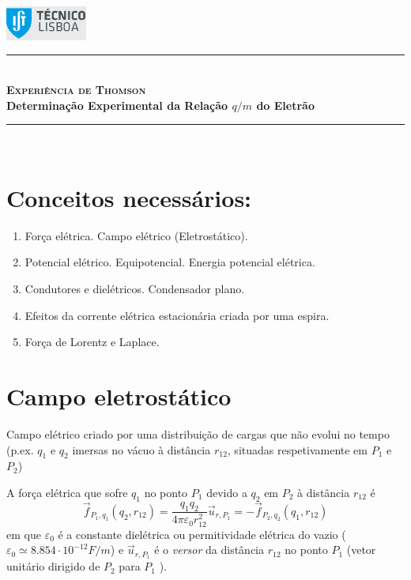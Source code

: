 \documentclass[a4paper,twoside,12pt]{article}      %
\author{Prof. Bernardo B. Carvalho}
\date{ Setembro 2012}
\newcommand{\HRule}{\rule{\linewidth}{0.5mm}}
\begin{document}
 

\includegraphics[width=0.2\textwidth]{../logo-ist}%

\HRule \\[0.5cm]
{ \huge   \bfseries \textsc{ Experiência de Thomson} }\\[0.4cm]
{ \large \bfseries Determinação Experimental da Relação $q/m$ do Eletrão }\\
\HRule \\%


\section{\sf  Conceitos necessários:} 
\begin{enumerate}
	\item Força elétrica. Campo elétrico (Eletrostático).
	\item Potencial elétrico. Equipotencial. Energia potencial elétrica.
	\item Condutores e dielétricos. Condensador plano.
	\item Efeitos da corrente elétrica estacionária criada por uma espira. 	
	\item Força de Lorentz e Laplace.
\end{enumerate}

\section{\sf Campo eletrostático}

 Campo elétrico criado por uma distribuição de cargas que não evolui no tempo (p.ex. $q_1$ e $q_2$ imersas no vácuo à distância $r_{12}$, situadas respetivamente em $P_1$ e $P_2$)

A força elétrica que sofre $q_1$ no ponto $P_1$ devido a $q_2$ em $P_2$ à distância $r_{12}$ é
\begin{equation}
	\vec{f}_{P_1,q_1} (q_2, r_{1 2} ) = \frac{q_1 q_2}{4 \pi \varepsilon_0 r_{1 2}^2} \vec{u}_{r,P_1} = 
	- \vec{f}_{P_2,q_2} (q_1, r_{1 2} )
\end{equation}
em que $\varepsilon_0$  é a constante dielétrica ou permitividade elétrica do vazio ($\varepsilon_0 \simeq 8.854 \cdot 10^{-12} F/m$) e	
 $\vec{u}_{r,P_1}$  é o \emph{versor} da distância $r_{1 2} $ no ponto $P_1$  (vetor unitário dirigido de $P_2$ para $P_1$ ).
\end{document}
